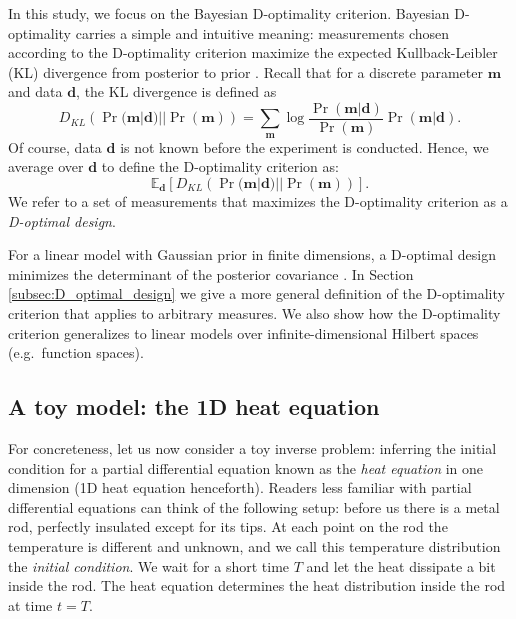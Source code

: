 \documentclass[ba]{imsart}
\newcommand{\data}{\mathbf{d}}
\newcommand{\param}{\mathbf{m}}
\theoremstyle{plain}
\theoremstyle{definition}
\theoremstyle{remark}
\begin{document}
In this study, we focus on the Bayesian D-optimality
criterion. Bayesian D-optimality carries a simple and intuitive
meaning: measurements chosen according to the D-optimality criterion
maximize the expected Kullback-Leibler (KL) divergence from posterior
to prior \cite{chaloner1995, AlexanderianGloorGhattas14,
  CoverThomas91}.
Recall that for a discrete parameter $\param$ and data $\data$, the KL
divergence is defined as
\begin{equation}\label{eq:basic_KL}
  D_{KL}\left (\Pr(\param|\data)||\Pr(\param)\right ) =  \sum_{\param} \log
  \frac{\Pr(\param|\data)}{\Pr(\param)} \Pr(\param|\data). 
\end{equation}
Of course, data $\data$ is not known before the experiment is
conducted. Hence, we average over $\data$ to define the D-optimality
criterion as:
\begin{equation*}
  \mathbb{E}_{\data}\left [ D_{KL}\left (\Pr(\param|\data)||\Pr(\param)\right ) \right ].
\end{equation*}
We refer to a set of measurements that maximizes the D-optimality
criterion as a \emph{D-optimal design}.

For a linear model with Gaussian prior in finite dimensions, a
D-optimal design minimizes the determinant of the posterior covariance
\cite{chaloner1995}. In Section \ref{subsec:D_optimal_design} we give
a more general definition of the D-optimality criterion that applies
to arbitrary measures. We also show how the D-optimality criterion
generalizes to linear models over infinite-dimensional Hilbert spaces
(e.g.~function spaces).

\subsection{A toy model: the 1D heat equation}\label{subsec:toy}
For concreteness, let us now consider a toy inverse problem: inferring
the initial condition for a partial differential equation known as the
\emph{heat equation} in one dimension (1D heat equation
henceforth). Readers less familiar with partial differential equations
can think of the following setup: before us there is a metal rod,
perfectly insulated except for its tips. At each point on the rod the
temperature is different and unknown, and we call this temperature
distribution the \emph{initial condition}. We wait for a short time
$T$ and let the heat dissipate a bit inside the rod. The heat equation
determines the heat distribution inside the rod at time $t=T$.
\end{document}
